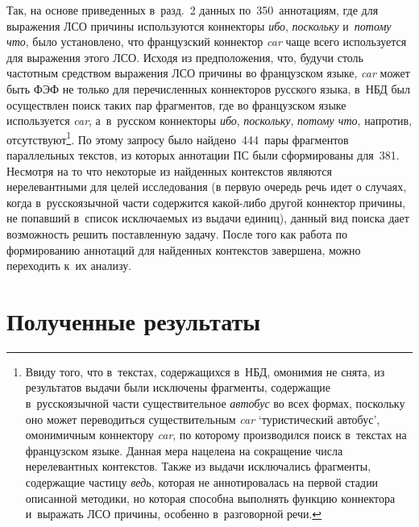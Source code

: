 \begin{multicols}{2}
   
Так, на основе приведенных в~разд.~2 данных по~350~аннотациям, где для выражения ЛСО причины 
используются коннекторы \textit{ибо}, \textit{поскольку} и~\textit{потому что}, было установлено, что 
французский коннектор \textit{car} чаще всего используется для выражения этого ЛСО. Исходя из 
предположения, что, будучи столь частотным средством выражения ЛСО причины во французском языке, 
\textit{car} может быть ФЭФ не только для перечисленных коннекторов русского языка, в~НБД был 
осуществлен поиск таких пар фрагментов, где во французском языке используется \textit{car}, а~в~русском 
коннекторы \textit{ибо}, \textit{поскольку}, \textit{потому что}, напротив, отсутствуют\footnote{Ввиду того, 
что в~текстах, содержащихся в~НБД, омонимия не снята, из результатов выдачи были исключены фрагменты, 
содержащие в~русскоязычной части существительное \textit{автобус} во всех формах, поскольку оно может 
переводиться существительным \textit{car} `туристический автобус', омонимичным коннектору \textit{car}, 
по которому производился поиск в~текстах на французском языке. Данная мера нацелена на сокращение 
числа нерелевантных контекстов. Также из выдачи исключались фрагменты, содержащие частицу 
\textit{ведь}, которая не аннотировалась на первой стадии описанной методики, но которая способна 
выполнять функцию коннектора и~выражать ЛСО причины, особенно в~разговорной речи.}. По этому запросу 
было найдено~444~пары фрагментов параллельных текстов, из которых аннотации ПС были сформированы 
для~381. Несмотря на то что некоторые из найденных контекстов являются нерелевантными для целей 
исследования (в первую очередь речь идет о случаях, когда в~русскоязычной части содержится  
ка\-кой-ли\-бо другой коннектор причины, не попавший в~список исключаемых из выдачи единиц), данный 
вид поиска дает возможность решить поставленную задачу. После того как работа по формированию 
аннотаций для найденных контекстов завершена, можно переходить к~их анализу.

\vspace*{-6pt}

\section{Полученные результаты}

\vspace*{-4pt}


\end{multicols}
